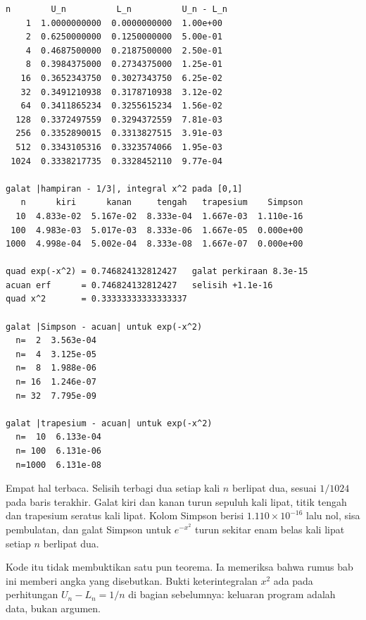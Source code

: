 \begin{verbatim}
n        U_n          L_n          U_n - L_n
    1  1.0000000000  0.0000000000  1.00e+00
    2  0.6250000000  0.1250000000  5.00e-01
    4  0.4687500000  0.2187500000  2.50e-01
    8  0.3984375000  0.2734375000  1.25e-01
   16  0.3652343750  0.3027343750  6.25e-02
   32  0.3491210938  0.3178710938  3.12e-02
   64  0.3411865234  0.3255615234  1.56e-02
  128  0.3372497559  0.3294372559  7.81e-03
  256  0.3352890015  0.3313827515  3.91e-03
  512  0.3343105316  0.3323574066  1.95e-03
 1024  0.3338217735  0.3328452110  9.77e-04

galat |hampiran - 1/3|, integral x^2 pada [0,1]
   n      kiri      kanan     tengah   trapesium    Simpson
  10  4.833e-02  5.167e-02  8.333e-04  1.667e-03  1.110e-16
 100  4.983e-03  5.017e-03  8.333e-06  1.667e-05  0.000e+00
1000  4.998e-04  5.002e-04  8.333e-08  1.667e-07  0.000e+00

quad exp(-x^2) = 0.746824132812427   galat perkiraan 8.3e-15
acuan erf      = 0.746824132812427   selisih +1.1e-16
quad x^2       = 0.33333333333333337

galat |Simpson - acuan| untuk exp(-x^2)
  n=  2  3.563e-04
  n=  4  3.125e-05
  n=  8  1.988e-06
  n= 16  1.246e-07
  n= 32  7.795e-09

galat |trapesium - acuan| untuk exp(-x^2)
  n=  10  6.133e-04
  n= 100  6.131e-06
  n=1000  6.131e-08
\end{verbatim}

Empat hal terbaca. Selisih terbagi dua setiap kali $n$ berlipat dua, sesuai $1/1024$
pada baris terakhir. Galat kiri dan kanan turun sepuluh kali lipat, titik tengah dan
trapesium seratus kali lipat. Kolom Simpson berisi $1.110\times10^{-16}$ lalu nol, sisa
pembulatan, dan galat Simpson untuk $e^{-x^2}$ turun sekitar enam belas kali lipat
setiap $n$ berlipat dua.

Kode itu tidak membuktikan satu pun teorema. Ia memeriksa bahwa rumus bab ini memberi
angka yang disebutkan. Bukti keterintegralan $x^2$ ada pada perhitungan $U_n-L_n=1/n$
di bagian sebelumnya: keluaran program adalah data, bukan argumen.

